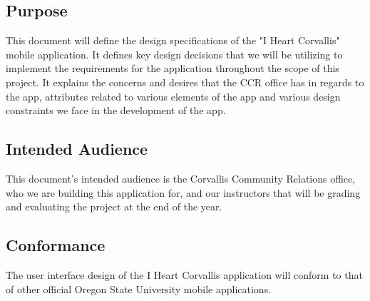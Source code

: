 \documentclass[draftclsnofoot, onecolumn, 10pt, compsoc]{IEEEtran}
\begin{document}
		\subsection{Purpose}
			This document will define the design specifications of the "I Heart Corvallis" mobile application. It defines key design decisions that we will be utilizing to implement the requirements for the application throughout the scope of this project. It explains the concerns and desires that the CCR office has in regards to the app, attributes related to various elements of the app and various design constraints we face in the development of the app.
		\subsection{Intended Audience}
			This document's intended audience is the Corvallis Community Relations office, who we are building this application for, and our instructors that will be grading and evaluating the project at the end of the year.
		\subsection{Conformance}
			The user interface design of the I Heart Corvallis application will conform to that of other official Oregon State University mobile applications.
		\newpage
		
\end{document}
